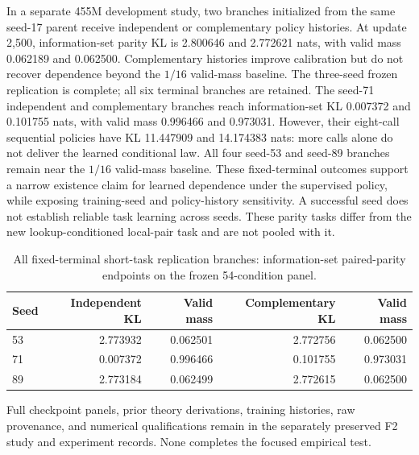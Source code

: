 \documentclass{article}
\begin{document}
In a separate 455M development study, two branches initialized from the same
seed-17 parent receive independent or complementary policy histories. At
update 2,500, information-set parity KL is 2.800646 and 2.772621 nats, with
valid mass 0.062189 and 0.062500. Complementary histories improve calibration
but do not recover dependence beyond the $1/16$ valid-mass baseline. The
three-seed frozen replication is complete; all six terminal branches are retained. The seed-71 independent
and complementary branches reach information-set KL 0.007372 and 0.101755
nats, with valid mass 0.996466 and 0.973031. However, their eight-call sequential
policies have KL 11.447909 and 14.174383 nats: more calls alone do not deliver
the learned conditional law. All four seed-53 and seed-89 branches remain near the $1/16$
valid-mass baseline. These fixed-terminal outcomes support a narrow existence
claim for learned dependence under the supervised policy, while exposing
training-seed and policy-history sensitivity. A successful seed does not establish
reliable task learning across seeds. These parity tasks
differ from the new lookup-conditioned local-pair task and are not pooled with it.

\begin{table}[h]
\centering\small
\caption{All fixed-terminal short-task replication branches: information-set
paired-parity endpoints on the frozen 54-condition panel.}
\begin{tabular}{@{}lrrrr@{}}
\toprule
Seed & Independent KL & Valid mass & Complementary KL & Valid mass\\
\midrule
53 & 2.773932 & 0.062501 & 2.772756 & 0.062500\\
71 & 0.007372 & 0.996466 & 0.101755 & 0.973031\\
89 & 2.773184 & 0.062499 & 2.772615 & 0.062500\\
\bottomrule
\end{tabular}
\end{table}



Full checkpoint panels, prior theory derivations, training histories, raw
provenance, and numerical qualifications remain in the separately preserved
F2 study and experiment records. None completes the focused empirical test.
\end{document}
